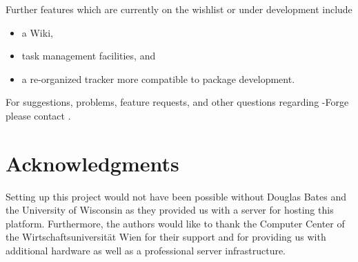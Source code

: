 Further features which are currently on the wishlist or under
development include 

\begin{itemize}
\item a Wiki,
\item task management facilities, and
\item a re-organized tracker more compatible to \R{} package development. 
\end{itemize}

For suggestions, problems, feature requests, and other questions regarding
\R{}-Forge please contact .

\section{Acknowledgments}

Setting up this project would not have been possible without Douglas
Bates and the University of Wisconsin as they provided us with a
server for hosting this platform. Furthermore, 
the authors would like to thank the Computer Center 
of the Wirtschaftsuniversit\"at Wien for
their support and for providing us with additional hardware as well as a
professional server infrastructure.


